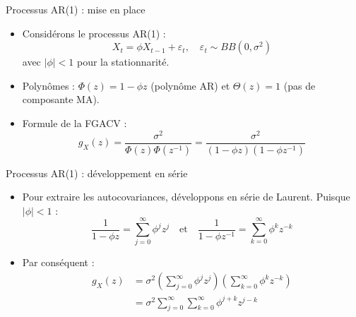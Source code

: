 \documentclass[11pt,aspectratio=169]{beamer}
\begin{document}
\begin{frame}{Processus AR(1) : mise en place}

\begin{itemize}

\item Considérons le processus AR(1) :
  \[
  X_t = \phi X_{t-1} + \varepsilon_t, \quad \varepsilon_t \sim BB(0, \sigma^2)
  \]
  avec $|\phi| < 1$ pour la stationnarité.\newline

\item Polynômes : $\Phi(z) = 1 - \phi z$ (polynôme AR) et $\Theta(z) = 1$ (pas de composante MA).\newline

\item Formule de la FGACV :
  \[
  g_X(z) = \frac{\sigma^2}{\Phi(z)\Phi(z^{-1})} = \frac{\sigma^2}{(1 - \phi z)(1 - \phi z^{-1})}
  \]

\end{itemize}

\end{frame}

\begin{frame}{Processus AR(1) : développement en série}

\begin{itemize}

\item Pour extraire les autocovariances, développons en série de Laurent. Puisque $|\phi| < 1$ :
  \[
  \frac{1}{1 - \phi z} = \sum_{j=0}^{\infty} \phi^j z^j \quad \text{et} \quad \frac{1}{1 - \phi z^{-1}} = \sum_{k=0}^{\infty} \phi^k z^{-k}
  \]\newline

\item Par conséquent :
  \begin{align*}
  g_X(z) &= \sigma^2 \left( \sum_{j=0}^{\infty} \phi^j z^j \right) \left( \sum_{k=0}^{\infty} \phi^k z^{-k} \right) \\
  &= \sigma^2 \sum_{j=0}^{\infty} \sum_{k=0}^{\infty} \phi^{j+k} z^{j-k}
  \end{align*}

\end{itemize}

\end{frame}
\end{document}
